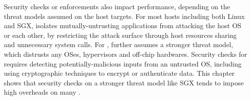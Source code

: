 Security checks or enforcements also
impact \thehostabi{} performance,
depending on the threat models assumed on the host targets.
For most hosts including both Linux and SGX,
\graphene{}
isolates
mutually-untrusting applications from attacking the host OS or each other, %
by restricting the attack surface through host resources sharing and unnecessary system calls.
For \sgx{},
\graphene{} further assumes a stronger threat model,
which distrusts any OSes, hypervisors and off-chip hardwares.
Security checks for \sgx{}
requires
detecting potentially-malicious inputs
from an untrusted OS,
including using cryptographic techniques
to encrypt or authenticate data.
This chapter shows that
security checks on a stronger threat model like SGX
tends to impose high overheads
on many \hostapis{}.

